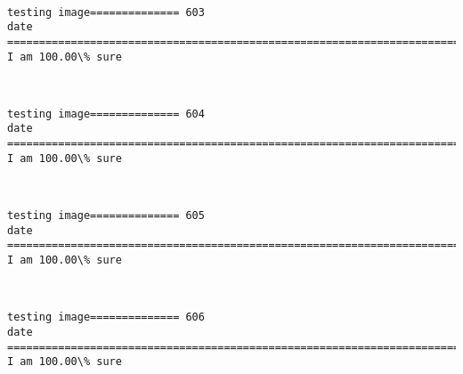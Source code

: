 \documentclass[11pt]{article}
\begin{document}
    \begin{center}
    \end{center}
    { \hspace*{\fill} \\}
    
    \begin{Verbatim}[commandchars=\\\{\}]
testing image============== 603
date
============================================================================
I am 100.00\% sure

    \end{Verbatim}

    \begin{center}
    \end{center}
    { \hspace*{\fill} \\}
    
    \begin{Verbatim}[commandchars=\\\{\}]
testing image============== 604
date
============================================================================
I am 100.00\% sure

    \end{Verbatim}

    \begin{center}
    \end{center}
    { \hspace*{\fill} \\}
    
    \begin{Verbatim}[commandchars=\\\{\}]
testing image============== 605
date
============================================================================
I am 100.00\% sure

    \end{Verbatim}

    \begin{center}
    \end{center}
    { \hspace*{\fill} \\}
    
    \begin{Verbatim}[commandchars=\\\{\}]
testing image============== 606
date
============================================================================
I am 100.00\% sure

    \end{Verbatim}
\end{document}
